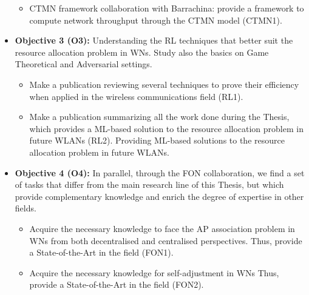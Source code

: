 \documentclass[12pt, a4paper,twoside]{tesi_upf}
\begin{document}
\begin{itemize}
\begin{itemize}
				\item CTMN framework collaboration with Barrachina: provide a framework to compute network throughput through the CTMN model (CTMN1).
			\end{itemize}	
			\item \textbf{Objective 3 (O3):} Understanding the RL techniques that better suit the resource allocation problem in WNs. Study also the basics on Game Theoretical and Adversarial settings.
			\begin{itemize}
				\item Make a publication reviewing several techniques to prove their efficiency when applied in the wireless communications field (RL1).
				\item Make a publication summarizing all the work done during the Thesis, which provides a ML-based solution to the resource allocation problem in future WLANs (RL2). Providing ML-based solutions to the resource allocation problem in future WLANs.
			\end{itemize}	
			\item \textbf{Objective 4 (O4):} In parallel, through the FON collaboration, we find a set of tasks that differ from the main research line of this Thesis, but which provide complementary knowledge and enrich the degree of expertise in other fields.
			\begin{itemize}
				\item Acquire the necessary knowledge to face the AP association problem in WNs from both decentralised and centralised perspectives. Thus, provide a State-of-the-Art in the field (FON1).
				\item Acquire the necessary knowledge for self-adjustment in WNs Thus, provide a State-of-the-Art in the field (FON2).
			\end{itemize}		
		\end{itemize}
	
\end{document}
